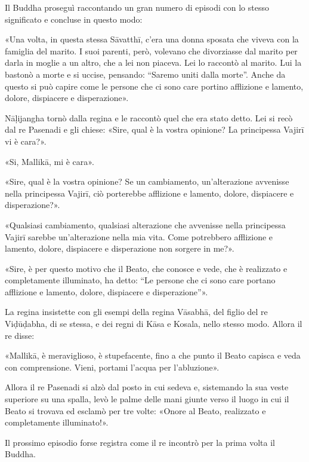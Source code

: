  Il Buddha proseguì raccontando un gran numero di
episodi con lo stesso significato e concluse in questo modo:

 «Una volta, in questa stessa Sāvatthī, c’era una donna
sposata che viveva con la famiglia del marito. I suoi parenti, però, volevano
che divorziasse dal marito per darla in moglie a un altro, che a lei non
piaceva. Lei lo raccontò al marito. Lui la bastonò a morte e si uccise,
pensando: “Saremo uniti dalla morte”. Anche da questo si può capire come le
persone che ci sono care portino afflizione e lamento, dolore, dispiacere e
disperazione».

Nāḷijangha tornò dalla regina e le raccontò quel che era stato detto. Lei si
recò dal re Pasenadi e gli chiese: «Sire, qual è la vostra opinione? La
principessa Vajirī vi è cara?».

«Si, Mallikā, mi è cara».

«Sire, qual è la vostra opinione? Se un cambiamento, un’alterazione avvenisse
nella principessa Vajirī, ciò porterebbe afflizione e lamento, dolore,
dispiacere e disperazione?».

«Qualsiasi cambiamento, qualsiasi alterazione che avvenisse nella principessa
Vajirī sarebbe un’alterazione nella mia vita. Come potrebbero afflizione e
lamento, dolore, dispiacere e disperazione non sorgere in me?».

«Sire, è per questo motivo che il Beato, che conosce e vede, che è realizzato e
completamente illuminato, ha detto: “Le persone che ci sono care portano
afflizione e lamento, dolore, dispiacere e disperazione”».

 La regina insistette con gli esempi della regina
Vāsabhā, del figlio del re Viḍūḍabha, di se stessa, e dei regni di Kāsa e
Kosala, nello stesso modo. Allora il re disse:

 «Mallikā, è meraviglioso, è stupefacente, fino a che punto
il Beato capisca e veda con comprensione. Vieni, portami l’acqua per
l’abluzione».

Allora il re Pasenadi si alzò dal posto in cui sedeva e, sistemando la sua veste
superiore su una spalla, levò le palme delle mani giunte verso il luogo in cui
il Beato si trovava ed esclamò per tre volte: «Onore al Beato, realizzato e
completamente illuminato!».


 Il prossimo episodio forse registra come il re
incontrò per la prima volta il Buddha.

